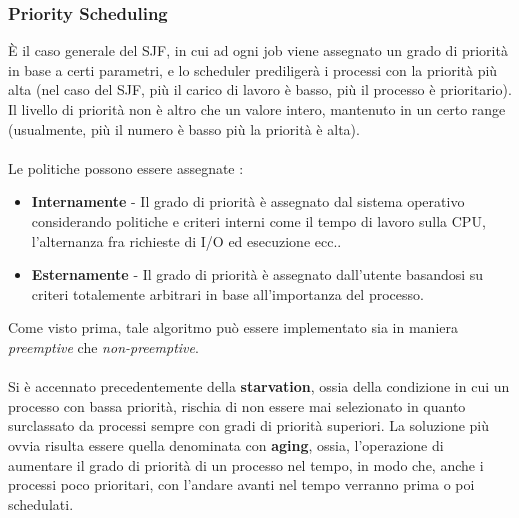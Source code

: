 \documentclass[12pt, letterpaper]{article}
\newcommand{\acc}{\\\hphantom{}\\}
\begin{document}
\subsubsection{Priority Scheduling} 
È il caso generale del SJF, in cui ad ogni job viene assegnato un 
grado di priorità in base a certi parametri, e lo scheduler 
prediligerà i processi con la priorità più alta (nel caso del SJF, 
più il carico di lavoro è basso, più il processo è prioritario). Il livello 
di priorità non è altro che un valore intero, mantenuto in un 
certo range (usualmente, più il numero è basso più la priorità 
è alta).\acc Le politiche possono essere assegnate :\begin{itemize}
    \item \textbf{Internamente} - Il grado di priorità è assegnato 
    dal sistema operativo considerando politiche e criteri interni come il tempo di lavoro 
    sulla CPU, l'alternanza fra richieste di I/O ed esecuzione ecc..
    \item \textbf{Esternamente} - Il grado di priorità è assegnato dall'utente 
    basandosi su criteri totalemente arbitrari in base all'importanza 
    del processo.
\end{itemize}
Come visto prima, tale algoritmo può essere implementato 
sia in maniera \textit{preemptive} che \textit{non-preemptive}.\acc
Si è accennato precedentemente della \textbf{starvation}, ossia della condizione 
in cui un processo con bassa priorità, rischia di non essere mai selezionato in 
quanto surclassato da processi sempre con gradi di priorità superiori. La 
soluzione più ovvia risulta essere quella denominata con \textbf{aging}, ossia, 
l'operazione di aumentare il grado di priorità di un processo nel tempo, in modo che,
anche i processi poco prioritari, con l'andare avanti nel tempo verranno prima o poi 
schedulati.
\end{document}
